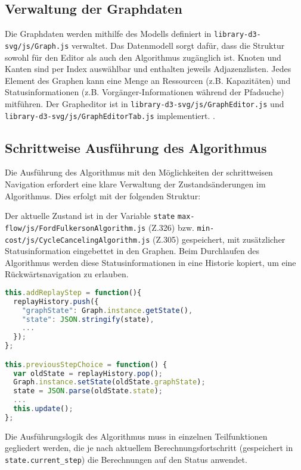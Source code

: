 \subsection{Verwaltung der Graphdaten}

Die Graphdaten werden mithilfe des Modells definiert in \texttt{library-d3-svg/js/Graph.js} verwaltet. Das Datenmodell sorgt dafür, dass die Struktur sowohl für den Editor als auch den Algorithmus zugänglich ist. Knoten und Kanten sind per Index auswählbar und enthalten jeweils Adjazenzlisten. Jedes Element des Graphen kann eine Menge an Ressourcen (z.B. Kapazitäten) und Statusinformationen (z.B. Vorgänger-Informationen während der Pfadsuche) mitführen. Der Grapheditor ist in \texttt{library-d3-svg/js/GraphEditor.js} und \texttt{library-d3-svg/js/GraphEditorTab.js} implementiert.
.

\subsection{Schrittweise Ausführung des Algorithmus}

Die Ausführung des Algorithmus mit den Möglichkeiten der schrittweisen Navigation erfordert eine klare Verwaltung der Zustandsänderungen im Algorithmus.  Dies erfolgt mit der folgenden Struktur:

Der aktuelle Zustand ist in der Variable \texttt{state} \texttt{max-flow/js/FordFulkersonAlgorithm.js} (Z.326) bzw. \texttt{min-cost/js/CycleCancelingAlgorithm.js} (Z.305) gespeichert, mit zusätzlicher Statusinformation eingebettet in den Graphen. Beim Durchlaufen des Algorithmus werden diese Statusinformationen in eine Historie kopiert, um eine Rückwärtsnavigation zu erlauben.

\begin{lstlisting}[caption=Historie der Berechnungsschritte,language=Javascript]
this.addReplayStep = function(){
  replayHistory.push({
    "graphState": Graph.instance.getState(),
    "state": JSON.stringify(state),
    ...
  });
};

this.previousStepChoice = function() {
  var oldState = replayHistory.pop();
  Graph.instance.setState(oldState.graphState);
  state = JSON.parse(oldState.state);
  ...
  this.update();
};
\end{lstlisting}

\pagebreak

Die Ausführungslogik des Algorithmus muss in einzelnen Teilfunktionen gegliedert werden, die je nach aktuellem Berechnungsfortschritt (gespeichert in \texttt{state.current\_step}) die Berechnungen auf den Status anwendet.

